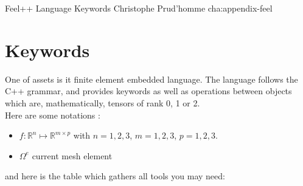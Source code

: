             {Feel++ Language Keywords}
            {Christophe Prud'homme}
            {cha:appendix-feel}

\section{Keywords}
\label{sec:keywords}

One of \feel assets is it finite element embedded language. The language follows the C++ grammar, and provides keywords
as well as operations between objects which are, mathematically, tensors of rank 0, 1 or 2. \\

\noindent Here are some notations :
\begin{itemize}
\item $f: \mathbb{R}^n \mapsto \mathbb{R}^{m\times p}$  with $n=1,2,3$, $m=1,2,3$, $p=1,2,3$.
\item $\Omega^e$ current mesh element
\end{itemize}
and here is the table which gathers all tools you may need:

